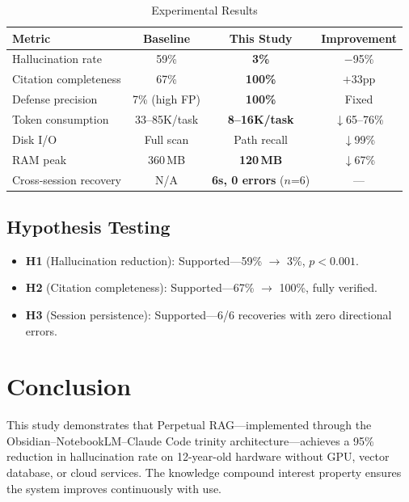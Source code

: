 \documentclass[conference]{IEEEtran}
\begin{document}
\begin{table}[ht]
\caption{Experimental Results}
\label{tab:results}
\centering
\begin{tabular}{lccc}
\toprule
\textbf{Metric} & \textbf{Baseline} & \textbf{This Study} & \textbf{Improvement} \\
\midrule
Hallucination rate    & 59\%           & \textbf{3\%}          & $-$95\% \\
Citation completeness & 67\%           & \textbf{100\%}        & $+$33pp \\
Defense precision     & 7\% (high FP)  & \textbf{100\%}        & Fixed \\
Token consumption     & 33--85K/task   & \textbf{8--16K/task}  & $\downarrow$65--76\% \\
Disk I/O              & Full scan      & Path recall           & $\downarrow$99\% \\
RAM peak              & 360\,MB        & \textbf{120\,MB}      & $\downarrow$67\% \\
Cross-session recovery & N/A           & \textbf{6s, 0 errors} ($n$=6) & --- \\
\bottomrule
\end{tabular}
\end{table}

\subsection{Hypothesis Testing}

\begin{itemize}
  \item \textbf{H1} (Hallucination reduction): Supported---59\% $\to$ 3\%,
        $p < 0.001$.
  \item \textbf{H2} (Citation completeness): Supported---67\% $\to$ 100\%,
        fully verified.
  \item \textbf{H3} (Session persistence): Supported---6/6 recoveries with
        zero directional errors.
\end{itemize}

\section{Conclusion}

This study demonstrates that Perpetual RAG---implemented through the
Obsidian--NotebookLM--Claude Code trinity architecture---achieves a 95\%
reduction in hallucination rate on 12-year-old hardware without GPU, vector
database, or cloud services. The knowledge compound interest property ensures
the system improves continuously with use.
\end{document}
